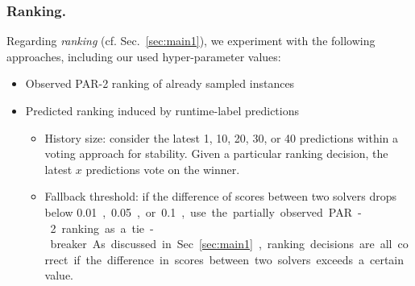 \documentclass[runningheads]{llncs}
\begin{document}
\subsubsection{Ranking.}
Regarding \emph{ranking} (cf. Sec.~\ref{sec:main1}), we experiment with the following approaches, including our used hyper-parameter values:
\begin{itemize}
  \item Observed PAR-2 ranking of already sampled instances
  \item Predicted ranking induced by runtime-label predictions
  \begin{itemize}
    \item History size: consider the latest 1, 10, 20, 30, or 40 predictions within a voting approach for stability. Given a particular ranking decision, the latest $x$ predictions vote on the winner.
    \item Fallback threshold: if the difference of scores between two solvers drops below \SI{0.01}, \SI{0.05}, or \SI{0.1}, use the partially observed PAR-2 ranking as a tie-breaker. As discussed in Sec.~\ref{sec:main1}, ranking decisions are all correct if the difference in scores between two solvers exceeds a certain value.
  \end{itemize}
\end{itemize}
\end{document}
